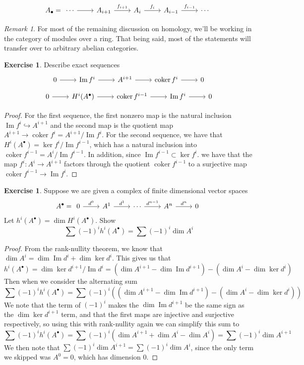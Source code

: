 \documentclass[psamsfonts]{amsart}
\theoremstyle{definition}
\newtheorem{exer}[thm]{Exercise}
\theoremstyle{remark}
\newtheorem*{rem*}{Remark}
\DeclareMathOperator{\im}{Im}
\DeclareMathOperator{\coker}{coker}
\begin{document}
$$A_\bullet = \begin{tikzcd}
\cdots \arrow[r] & A_{i+1} \arrow[r, "f_{i+1}"] & A_i \arrow[r, "f_i"] & A_{i-1} \arrow[r, "f_{i-1}"] & \cdots
\end{tikzcd}$$
\begin{rem*}
For most of the remaining discussion on homology, we'll be working in the category of modules over a ring. That being said, most of the statements will transfer over to arbitrary abelian categories.
\end{rem*}
%
\begin{exer}
Describe exact sequences
$$\begin{tikzcd}
0 \arrow[r] & \im f^i \arrow[r] & A^{i+1} \arrow[r] & \coker f^i \arrow[r] & 0
\end{tikzcd}$$
$$\begin{tikzcd}
0 \arrow[r] & H^i(A^\bullet) \arrow[r] & \coker f^{i-1} \arrow[r] & \im f^i \arrow[r] & 0
\end{tikzcd}$$
\end{exer}
%
\begin{proof}
For the first sequence, the first nonzero map is the natural inclusion $\im f^i \hookrightarrow A^{i+1}$ and the second map is the quotient map $A^{i+1} \to \coker f^i = A^{i+1} / \im f^i$. For the second sequence, we have that $H^i(A^\bullet) = \ker f^i / \im f^{i-1}$, which has a natural inclusion into $\coker f^{i-1} = A^i / \im f^{i-1}$. In addition, since $\im f^{i-1} \subset \ker f^i$. we have that the map $f^i : A^i \to A^{i+1}$ factors through the quotient $\coker f^{i-1}$ to a surjective map $\coker f^{i-1} \to \im f^i$.
\end{proof}
%
\begin{exer}
Suppose we are given a complex of finite dimensional vector spaces
$$ A^\bullet = \begin{tikzcd}
0 \arrow[r, "d^0"] & A^1 \arrow[r, "d^1"] & \cdots \arrow[r, "d^{n-1}"] & A^n \arrow[r, "d^n"] & 0
\end{tikzcd}$$
Let $h^i(A^\bullet) = \dim H^i(A^\bullet)$. Show
$$\sum (-1)^i h^i(A^\bullet) = \sum (-1)^i \dim A^i $$
\end{exer}
%
\begin{proof}
From the rank-nullity theorem, we know that $\dim A^i = \dim \im d^i  + \dim \ker d^i$. This gives us that 
$$ h^i(A^\bullet) = \dim \ker d^{i+1} / \im d^i = (\dim A^{i+1} - \dim \im d^{i+1}) - (\dim A^i - \dim\ker d^i) $$
Then when we consider the alternating sum
$$ \sum (-1)^i h^i(A^\bullet) = \sum (-1)^i  ((\dim A^{i+1} - \dim \im d^{i+1}) - (\dim A^i - \dim\ker d^i)) $$
We note that the term of $(-1)^i$ makes the $\dim \im d^{i +1}$ be the same sign as the $\dim \ker d^{i+1}$ term, and that the first maps are injective and surjective respectively, so using this with rank-nullity again we can simplify this sum to
$$ \sum (-1)^i h^i(A^\bullet) = \sum (-1)^i (\dim A^{i+1} + \dim A^i - \dim A^i) = \sum (-1)^i \dim A^{i+1}$$
We then note that $\sum(-1)^i \dim A^{i+1} = \sum(-1)^i \dim A^i$, since the only term we skipped was $A^0 = 0$, which has dimension $0$.
\end{proof}
\end{document}
